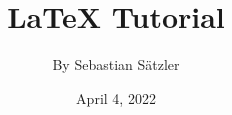 \documentclass[a4paper, 12pt]{book}
\begin{document}
\title{\Large{\textbf{LaTeX Tutorial}}}
\author{By Sebastian Sätzler}
\date{April 4, 2022}

\maketitle

\blindtext[5]
\end{document}
